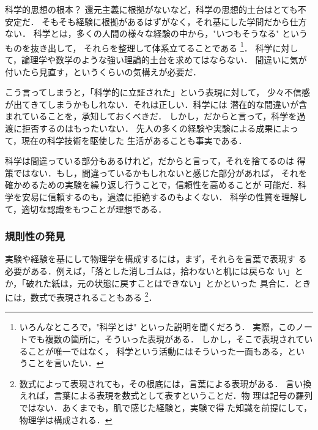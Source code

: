             \begin{memo}{科学的思想の根本？}
                還元主義に根拠がないなど，科学の思想的土台はとても不安定だ．
                そもそも経験に根拠があるはずがなく，それ基にした学問だから仕方ない．
                科学とは，多くの人間の様々な経験の中から，"いつもそうなる" というものを抜き出して，
                それらを整理して体系立てることである
                    \footnote{
                        いろんなところで，"科学とは" といった説明を聞くだろう．
                        実際，このノートでも複数の箇所に，そういった表現がある．
                        しかし，そこで表現されていることが唯一ではなく，
                        科学という活動にはそういった一面もある，ということを言いたい．
                    }．
                科学に対して，論理学や数学のような強い理論的土台を求めてはならない．
                間違いに気が付いたら見直す，というくらいの気構えが必要だ．

                こう言ってしまうと，「科学的に立証された」という表現に対して，
                少々不信感が出てきてしまうかもしれない．それは正しい．科学には
                潜在的な間違いが含まれていることを，承知しておくべきだ．
                しかし，だからと言って，科学を過渡に拒否するのはもったいない．
                先人の多くの経験や実験による成果によって，現在の科学技術を駆使した
                生活があることも事実である．

                科学は間違っている部分もあるけれど，だからと言って，それを捨てるのは
                得策ではない．もし，間違っているかもしれないと感じた部分があれば，
                それを確かめるための実験を繰り返し行うことで，信頼性を高めることが
                可能だ．科学を安易に信頼するのも，過渡に拒絶するのもよくない．
                科学の性質を理解して，適切な認識をもつことが理想である．
            \end{memo}

            \subsubsection{規則性の発見}
            実験や経験を基にして物理学を構成するには，まず，それらを言葉で表現す
            る必要がある．例えば，「落とした消しゴムは，拾わないと机には戻らな
            い」とか，「破れた紙は，元の状態に戻すことはできない」とかといった
            具合に．ときには，数式で表現されることもある
                \footnote{
                    数式によって表現されても，その根底には，言葉による表現がある．
                    言い換えれば，言葉による表現を数式として表すということだ．物
                    理は記号の羅列ではない．あくまでも，肌で感じた経験と，実験で得
                    た知識を前提にして，物理学は構成される．
                }．

